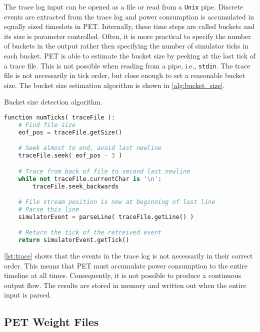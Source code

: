 The trace log input can be opened as a file or read from a \texttt{Unix} pipe.
Discrete events are extracted from the trace log and power consumption is
accumulated in equally sized timeslots in PET. Internally, these time steps are
called buckets and its size is parameter controlled. Often, it is more practical
to specify the number of buckets in the output rather then specifying the number
of simulator ticks in each bucket. PET is able to estimate the bucket size by
peeking at the last tick of a trace file. This is not possible when reading from
a pipe, i.e., \texttt{stdin}. The trace file is not necessarily in tick order,
but close enough to set a reasonable bucket size. The bucket size estimation
algorithm is shown in
\autoref{alg:bucket_size}.

\begin{algorithm}[htb]
    \caption{Bucket size detection algorithm.}
    \label{alg:bucket_size}
    \begin{lstlisting}[language=Python,style=algo]
function numTicks( traceFile ):
    # Find file size
    eof_pos = traceFile.getSize()

    # Seek almost to end, avoid last newline
    traceFile.seek( eof_pos - 3 )

    # Trace from back of file to second last newline
    while not traceFile.currentChar is '\n':
        traceFile.seek_backwards

    # File stream position is now at beginning of last line
    # Parse this line
    simulatorEvent = parseLine( traceFile.getLine() )

    # Return the tick of the retreived event
    return simulatorEvent.getTick()
    \end{lstlisting}
\end{algorithm}

\autoref{lst:trace} shows that the events in the trace log is not necessarily in
their correct order. This means that PET must accumulate power consumption to the
entire timeline at all times. Consequently, it is not possible to produce a
continuous output flow. The results are stored in memory and written out when the
entire input is parsed.

\subsection{PET Weight Files}

